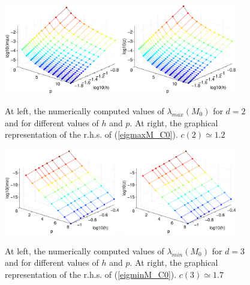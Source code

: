 \documentclass[11pt]{article}
\begin{document}
\begin{figure}
\begin{center}
\includegraphics[width=0.45\textwidth]{Images/iga0_eigM2max.eps}\quad
\includegraphics[width=0.45\textwidth]{Images/iga0_eigM2smax.eps}\\
\end{center}
\caption{At left, the numerically computed values of
$\lambda_{max}(M_0)$ for $d=2$ and
for different values of $h$ and $p$. At right,
the graphical representation of the r.h.s. of (\ref{eigmaxM_C0}). $c(2)
\simeq 1.2$}
\label{fig:massamax-iga0d2}
\end{figure}

\begin{figure}
\begin{center}
\includegraphics[width=0.45\textwidth]{Images/iga0_eigM3min.eps}\quad
\includegraphics[width=0.45\textwidth]{Images/iga0_eigM3smin.eps}\\
\end{center}
\caption{At left, the numerically computed values of
$\lambda_{min}(M_0)$ for $d=3$ and
for different values of $h$ and $p$. At right,
the graphical representation of the r.h.s. of (\ref{eigminM_C0}). $c(3)
\simeq 1.7$}
\label{fig:massamin-iga0d3}
\end{figure}
\end{document}
